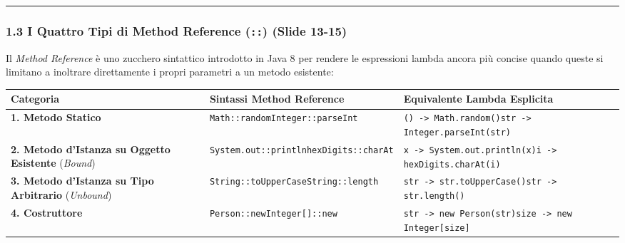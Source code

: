 \documentclass[11pt,a4paper]{article}
\newcommand{\passthrough}[1]{#1}
\begin{document}
\begin{center}\rule{0.5\linewidth}{0.5pt}\end{center}

\subsubsection{\texorpdfstring{1.3 I Quattro Tipi di Method Reference
(\texttt{::}) (Slide
13-15)}{1.3 I Quattro Tipi di Method Reference (::) (Slide 13-15)}}\label{i-quattro-tipi-di-method-reference-slide-13-15}

Il \emph{Method Reference} è uno zucchero sintattico introdotto in Java
8 per rendere le espressioni lambda ancora più concise quando queste si
limitano a inoltrare direttamente i propri parametri a un metodo
esistente:

\begin{longtable}[]{@{}
  >{\raggedright\arraybackslash}p{}
  >{\raggedright\arraybackslash}p{}
  >{\raggedright\arraybackslash}p{}@{}}
\toprule\noalign{}
\begin{minipage}[b]{\linewidth}\raggedright
Categoria
\end{minipage} & \begin{minipage}[b]{\linewidth}\raggedright
Sintassi Method Reference
\end{minipage} & \begin{minipage}[b]{\linewidth}\raggedright
Equivalente Lambda Esplicita
\end{minipage} \\
\midrule\noalign{}
\endhead
\bottomrule\noalign{}
\endlastfoot
\textbf{1. Metodo Statico} &
\passthrough{\lstinline!Math::random!}\passthrough{\lstinline!Integer::parseInt!}
&
\passthrough{\lstinline!() -> Math.random()!}\passthrough{\lstinline!str -> Integer.parseInt(str)!} \\
\textbf{2. Metodo d'Istanza su Oggetto Esistente} (\emph{Bound}) &
\passthrough{\lstinline!System.out::println!}\passthrough{\lstinline!hexDigits::charAt!}
&
\passthrough{\lstinline!x -> System.out.println(x)!}\passthrough{\lstinline!i -> hexDigits.charAt(i)!} \\
\textbf{3. Metodo d'Istanza su Tipo Arbitrario} (\emph{Unbound}) &
\passthrough{\lstinline!String::toUpperCase!}\passthrough{\lstinline!String::length!}
&
\passthrough{\lstinline!str -> str.toUpperCase()!}\passthrough{\lstinline!str -> str.length()!} \\
\textbf{4. Costruttore} &
\passthrough{\lstinline!Person::new!}\passthrough{\lstinline!Integer[]::new!}
&
\passthrough{\lstinline!str -> new Person(str)!}\passthrough{\lstinline!size -> new Integer[size]!} \\
\end{longtable}
\end{document}

